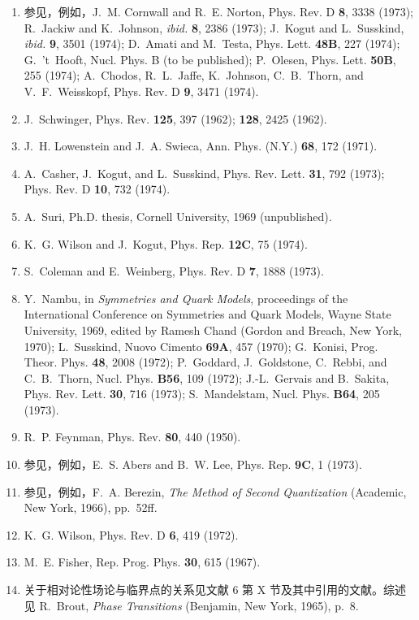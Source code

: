 \begin{center}
\begin{minipage}{0.93\textwidth}
\begin{enumerate}[leftmargin=1.6em,itemsep=1pt,parsep=0pt,topsep=2pt]
\item 参见，例如，J.~M. Cornwall and R.~E. Norton, Phys. Rev. D \textbf{8}, 3338 (1973); R.~Jackiw and K.~Johnson, \emph{ibid.} \textbf{8}, 2386 (1973); J.~Kogut and L.~Susskind, \emph{ibid.} \textbf{9}, 3501 (1974); D.~Amati and M.~Testa, Phys. Lett. \textbf{48B}, 227 (1974); G.~'t~Hooft, Nucl. Phys. B (to be published); P.~Olesen, Phys. Lett. \textbf{50B}, 255 (1974); A.~Chodos, R.~L.~Jaffe, K.~Johnson, C.~B.~Thorn, and V.~F.~Weisskopf, Phys. Rev. D \textbf{9}, 3471 (1974).
\item J.~Schwinger, Phys. Rev. \textbf{125}, 397 (1962); \textbf{128}, 2425 (1962).
\item J.~H. Lowenstein and J.~A. Swieca, Ann. Phys. (N.Y.) \textbf{68}, 172 (1971).
\item A.~Casher, J.~Kogut, and L.~Susskind, Phys. Rev. Lett. \textbf{31}, 792 (1973); Phys. Rev. D \textbf{10}, 732 (1974).
\item A.~Suri, Ph.D. thesis, Cornell University, 1969 (unpublished).
\item K.~G. Wilson and J.~Kogut, Phys. Rep. \textbf{12C}, 75 (1974).
\item S.~Coleman and E.~Weinberg, Phys. Rev. D \textbf{7}, 1888 (1973).
\item Y.~Nambu, in \emph{Symmetries and Quark Models}, proceedings of the International Conference on Symmetries and Quark Models, Wayne State University, 1969, edited by Ramesh Chand (Gordon and Breach, New York, 1970); L.~Susskind, Nuovo Cimento \textbf{69A}, 457 (1970); G.~Konisi, Prog. Theor. Phys. \textbf{48}, 2008 (1972); P.~Goddard, J.~Goldstone, C.~Rebbi, and C.~B.~Thorn, Nucl. Phys. \textbf{B56}, 109 (1972); J.-L.~Gervais and B.~Sakita, Phys. Rev. Lett. \textbf{30}, 716 (1973); S.~Mandelstam, Nucl. Phys. \textbf{B64}, 205 (1973).
\item R.~P. Feynman, Phys. Rev. \textbf{80}, 440 (1950).
\item 参见，例如，E.~S. Abers and B.~W. Lee, Phys. Rep. \textbf{9C}, 1 (1973).
\item 参见，例如，F.~A. Berezin, \emph{The Method of Second Quantization} (Academic, New York, 1966), pp.~52ff.
\item K.~G. Wilson, Phys. Rev. D \textbf{6}, 419 (1972).
\item M.~E. Fisher, Rep. Prog. Phys. \textbf{30}, 615 (1967).
\item 关于相对论性场论与临界点的关系见文献 6 第 X 节及其中引用的文献。综述见 R.~Brout, \emph{Phase Transitions} (Benjamin, New York, 1965), p.~8.

\end{enumerate}
\end{minipage}
\end{center}
